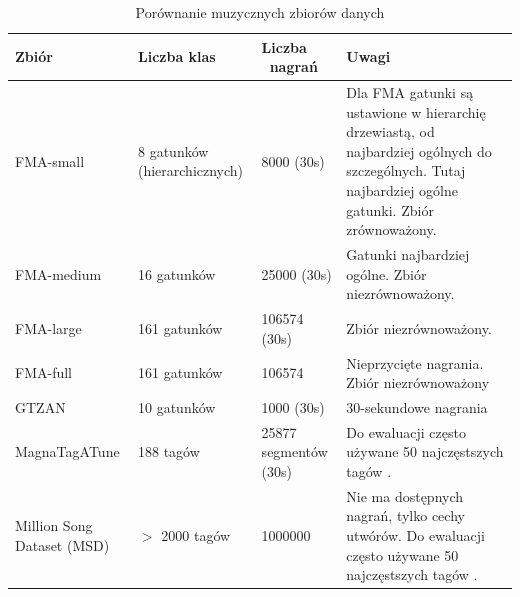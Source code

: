 \begin{table}[h]
    \centering
    \begin{tabular}{|p{3cm}|p{3cm}|p{2.7cm}|p{6cm}|}
        \hline
        \textbf{Zbiór}                                        & \textbf{Liczba klas}         & \textbf{Liczba \ nagrań} & \textbf{Uwagi}                                                                                                                                       \\
        \hline
        FMA-small                                             & 8 gatunków (hierarchicznych) & 8000 (30s)               & Dla FMA gatunki są ustawione w hierarchię drzewiastą, od najbardziej ogólnych do szczególnych. Tutaj najbardziej ogólne gatunki. Zbiór zrównoważony. \\
        \hline
        FMA-medium                                            & 16 gatunków                  & 25000 (30s)              & Gatunki najbardziej ogólne. Zbiór niezrównoważony.                                                                                                   \\
        \hline
        FMA-large                                             & 161 gatunków                 & 106574 (30s)             & Zbiór niezrównoważony.                                                                                                                               \\
        \hline
        FMA-full                                              & 161 gatunków                 & 106574                   & Nieprzycięte nagrania. Zbiór niezrównoważony                                                                                                         \\
        \hline

        GTZAN \cite{tzanetakis2002}                           & 10 gatunków                  & 1000 (30s)               & 30-sekundowe nagrania                                                                                                                                \\
        \hline
        MagnaTagATune\cite{magnatagatune_dataset}             & 188 tagów                    & 25877 segmentów (30s)    & Do ewaluacji często używane 50 najczęstszych tagów \cite{ferraro2020}.
        \\
        \hline
        Million Song Dataset (MSD)\cite{million_song_dataset} & $>$ 2000 tagów               & 1000000                  & Nie ma dostępnych nagrań, tylko cechy utwórów. Do ewaluacji często używane 50 najczęstszych tagów \cite{ferraro2020}.                                \\
        \hline
    \end{tabular}
    \caption{Porównanie muzycznych zbiorów danych}
    \label{tab:datasets}
\end{table}